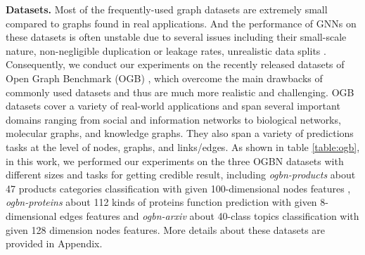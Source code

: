 \documentclass{article} \usepackage{iclr2021_conference,times}
\begin{document}
\textbf{Datasets.} Most of the frequently-used graph datasets are extremely small compared to graphs found in real applications. And the performance of GNNs on these datasets is often unstable due to several issues including
their small-scale nature, non-negligible duplication or leakage rates, unrealistic data splits \citep{dwivedi2020benchmarking,hu2020open}. Consequently, we conduct our experiments on the recently released datasets of Open Graph Benchmark (OGB) \citep{hu2020open}, which overcome the main drawbacks of commonly used datasets and thus
are much more realistic and challenging. OGB datasets cover a variety of real-world applications and span several important domains ranging from social and information networks to biological networks, molecular graphs, and knowledge graphs. They also span a variety of predictions tasks at the level of nodes, graphs, and links/edges. As shown in table \ref{table:ogb}, in this work, we performed our experiments on the three OGBN datasets with different sizes and tasks for getting credible result, including \emph{ogbn-products} about 47 products categories classification with given 100-dimensional nodes features , \emph{ogbn-proteins} about 112 kinds of proteins function prediction with given 8-dimensional edges features and \emph{ogbn-arxiv} about 40-class topics classification with given 128 dimension nodes features. More details about these datasets are provided in Appendix.
\end{document}
